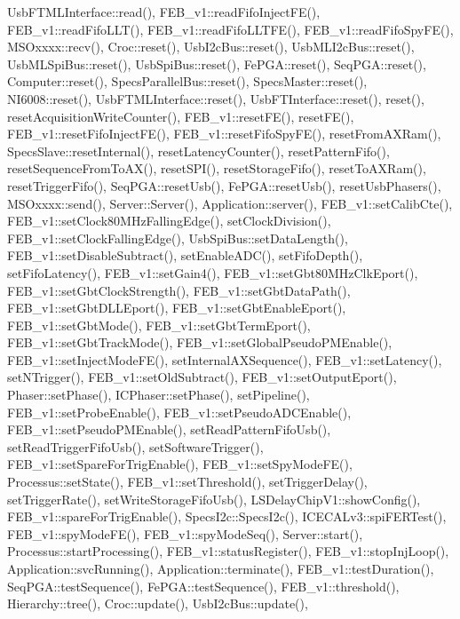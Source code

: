 Usb\+F\+T\+M\+L\+Interface\+::read(), F\+E\+B\+\_\+v1\+::read\+Fifo\+Inject\+F\+E(), F\+E\+B\+\_\+v1\+::read\+Fifo\+L\+L\+T(), F\+E\+B\+\_\+v1\+::read\+Fifo\+L\+L\+T\+F\+E(), F\+E\+B\+\_\+v1\+::read\+Fifo\+Spy\+F\+E(), M\+S\+Oxxxx\+::recv(), Croc\+::reset(), Usb\+I2c\+Bus\+::reset(), Usb\+M\+L\+I2c\+Bus\+::reset(), Usb\+M\+L\+Spi\+Bus\+::reset(), Usb\+Spi\+Bus\+::reset(), Fe\+P\+G\+A\+::reset(), Seq\+P\+G\+A\+::reset(), Computer\+::reset(), Specs\+Parallel\+Bus\+::reset(), Specs\+Master\+::reset(), N\+I6008\+::reset(), Usb\+F\+T\+M\+L\+Interface\+::reset(), Usb\+F\+T\+Interface\+::reset(), reset(), reset\+Acquisition\+Write\+Counter(), F\+E\+B\+\_\+v1\+::reset\+F\+E(), reset\+F\+E(), F\+E\+B\+\_\+v1\+::reset\+Fifo\+Inject\+F\+E(), F\+E\+B\+\_\+v1\+::reset\+Fifo\+Spy\+F\+E(), reset\+From\+A\+X\+Ram(), Specs\+Slave\+::reset\+Internal(), reset\+Latency\+Counter(), reset\+Pattern\+Fifo(), reset\+Sequence\+From\+To\+A\+X(), reset\+S\+P\+I(), reset\+Storage\+Fifo(), reset\+To\+A\+X\+Ram(), reset\+Trigger\+Fifo(), Seq\+P\+G\+A\+::reset\+Usb(), Fe\+P\+G\+A\+::reset\+Usb(), reset\+Usb\+Phasers(), M\+S\+Oxxxx\+::send(), Server\+::\+Server(), Application\+::server(), F\+E\+B\+\_\+v1\+::set\+Calib\+Cte(), F\+E\+B\+\_\+v1\+::set\+Clock80\+M\+Hz\+Falling\+Edge(), set\+Clock\+Division(), F\+E\+B\+\_\+v1\+::set\+Clock\+Falling\+Edge(), Usb\+Spi\+Bus\+::set\+Data\+Length(), F\+E\+B\+\_\+v1\+::set\+Disable\+Subtract(), set\+Enable\+A\+D\+C(), set\+Fifo\+Depth(), set\+Fifo\+Latency(), F\+E\+B\+\_\+v1\+::set\+Gain4(), F\+E\+B\+\_\+v1\+::set\+Gbt80\+M\+Hz\+Clk\+Eport(), F\+E\+B\+\_\+v1\+::set\+Gbt\+Clock\+Strength(), F\+E\+B\+\_\+v1\+::set\+Gbt\+Data\+Path(), F\+E\+B\+\_\+v1\+::set\+Gbt\+D\+L\+L\+Eport(), F\+E\+B\+\_\+v1\+::set\+Gbt\+Enable\+Eport(), F\+E\+B\+\_\+v1\+::set\+Gbt\+Mode(), F\+E\+B\+\_\+v1\+::set\+Gbt\+Term\+Eport(), F\+E\+B\+\_\+v1\+::set\+Gbt\+Track\+Mode(), F\+E\+B\+\_\+v1\+::set\+Global\+Pseudo\+P\+M\+Enable(), F\+E\+B\+\_\+v1\+::set\+Inject\+Mode\+F\+E(), set\+Internal\+A\+X\+Sequence(), F\+E\+B\+\_\+v1\+::set\+Latency(), set\+N\+Trigger(), F\+E\+B\+\_\+v1\+::set\+Old\+Subtract(), F\+E\+B\+\_\+v1\+::set\+Output\+Eport(), Phaser\+::set\+Phase(), I\+C\+Phaser\+::set\+Phase(), set\+Pipeline(), F\+E\+B\+\_\+v1\+::set\+Probe\+Enable(), F\+E\+B\+\_\+v1\+::set\+Pseudo\+A\+D\+C\+Enable(), F\+E\+B\+\_\+v1\+::set\+Pseudo\+P\+M\+Enable(), set\+Read\+Pattern\+Fifo\+Usb(), set\+Read\+Trigger\+Fifo\+Usb(), set\+Software\+Trigger(), F\+E\+B\+\_\+v1\+::set\+Spare\+For\+Trig\+Enable(), F\+E\+B\+\_\+v1\+::set\+Spy\+Mode\+F\+E(), Processus\+::set\+State(), F\+E\+B\+\_\+v1\+::set\+Threshold(), set\+Trigger\+Delay(), set\+Trigger\+Rate(), set\+Write\+Storage\+Fifo\+Usb(), L\+S\+Delay\+Chip\+V1\+::show\+Config(), F\+E\+B\+\_\+v1\+::spare\+For\+Trig\+Enable(), Specs\+I2c\+::\+Specs\+I2c(), I\+C\+E\+C\+A\+Lv3\+::spi\+F\+E\+R\+Test(), F\+E\+B\+\_\+v1\+::spy\+Mode\+F\+E(), F\+E\+B\+\_\+v1\+::spy\+Mode\+Seq(), Server\+::start(), Processus\+::start\+Processing(), F\+E\+B\+\_\+v1\+::status\+Register(), F\+E\+B\+\_\+v1\+::stop\+Inj\+Loop(), Application\+::svc\+Running(), Application\+::terminate(), F\+E\+B\+\_\+v1\+::test\+Duration(), Seq\+P\+G\+A\+::test\+Sequence(), Fe\+P\+G\+A\+::test\+Sequence(), F\+E\+B\+\_\+v1\+::threshold(), Hierarchy\+::tree(), Croc\+::update(), Usb\+I2c\+Bus\+::update(), 